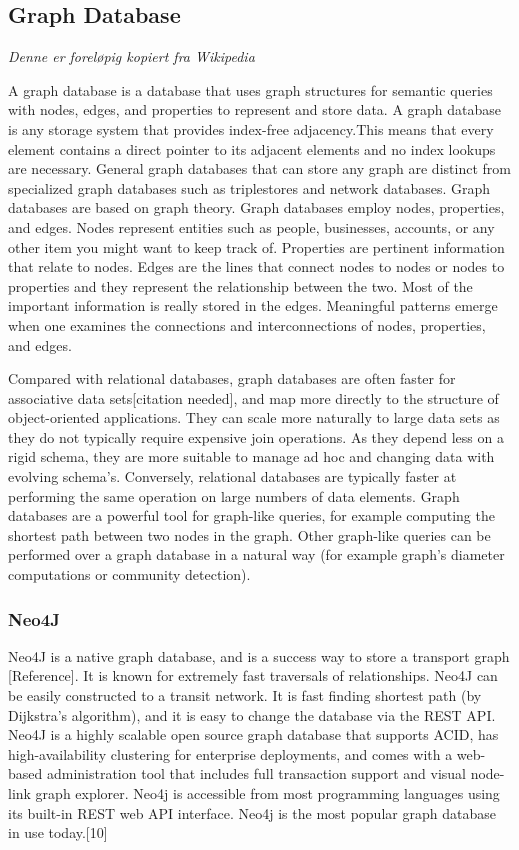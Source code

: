 \subsection{Graph Database}
\textit{Denne er foreløpig kopiert fra Wikipedia}
\par
A graph database is a database that uses graph structures for semantic queries with nodes, edges, and properties to represent and store data. A graph database is any storage system that provides index-free adjacency.This means that every element contains a direct pointer to its adjacent elements and no index lookups are necessary. General graph databases that can store any graph are distinct from specialized graph databases such as triplestores and network databases.
Graph databases are based on graph theory. Graph databases employ nodes, properties, and edges. Nodes represent entities such as people, businesses, accounts, or any other item you might want to keep track of. Properties are pertinent information that relate to nodes. Edges are the lines that connect nodes to nodes or nodes to properties and they represent the relationship between the two. Most of the important information is really stored in the edges. Meaningful patterns emerge when one examines the connections and interconnections of nodes, properties, and edges.

Compared with relational databases, graph databases are often faster for associative data sets[citation needed], and map more directly to the structure of object-oriented applications. They can scale more naturally to large data sets as they do not typically require expensive join operations. As they depend less on a rigid schema, they are more suitable to manage ad hoc and changing data with evolving schema's. Conversely, relational databases are typically faster at performing the same operation on large numbers of data elements.
Graph databases are a powerful tool for graph-like queries, for example computing the shortest path between two nodes in the graph. Other graph-like queries can be performed over a graph database in a natural way (for example graph's diameter computations or community detection).

\subsubsection{Neo4J}
Neo4J is a native graph database, and is a success way to store a transport graph [Reference]. It is known for extremely fast traversals of relationships. Neo4J can be easily constructed to a transit network. It is fast finding shortest path (by Dijkstra's algorithm), and it is easy to change the database via the REST API. 
Neo4J is a highly scalable open source graph database that supports ACID, has high-availability clustering for enterprise deployments, and comes with a web-based administration tool that includes full transaction support and visual node-link graph explorer. Neo4j is accessible from most programming languages using its built-in REST web API interface. Neo4j is the most popular graph database in use today.[10]


